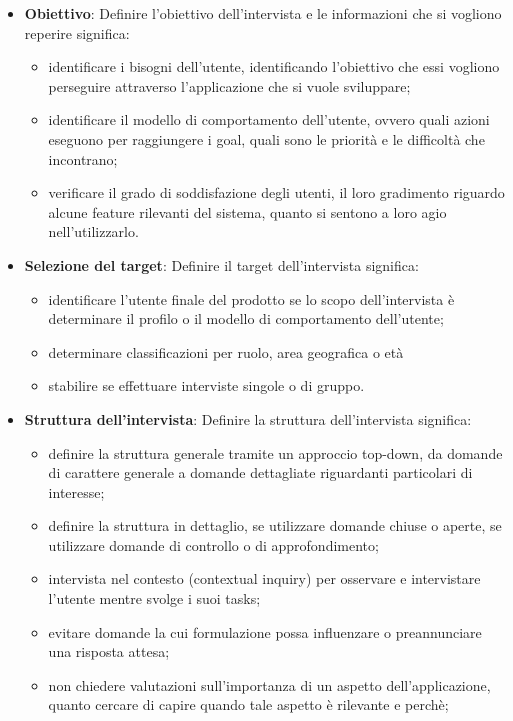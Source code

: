 \documentclass{report}
\begin{document}
	\begin{itemize}
		\item \textbf{Obiettivo}: Definire l'obiettivo dell'intervista e le informazioni che si vogliono reperire significa:
		\begin{itemize}
			\item identificare i bisogni dell'utente, identificando l'obiettivo che essi vogliono perseguire attraverso l'applicazione che si vuole sviluppare;
			\item identificare il modello di comportamento dell'utente, ovvero quali azioni eseguono per raggiungere i goal, quali sono le priorità e le difficoltà che incontrano;
			\item verificare il grado di soddisfazione degli utenti, il loro gradimento riguardo alcune feature rilevanti del sistema, quanto si sentono a loro agio nell'utilizzarlo.
		\end{itemize}
		\item \textbf{Selezione del target}: Definire il target dell'intervista significa:
		\begin{itemize}
			\item identificare l'utente finale del prodotto se lo scopo dell'intervista è determinare il profilo o il modello di comportamento dell'utente;
			\item determinare classificazioni per ruolo, area geografica o età
			\item stabilire se effettuare interviste singole o di gruppo.
		\end{itemize}
		\item \textbf{Struttura dell'intervista}: Definire la struttura dell'intervista significa:
		\begin{itemize}
			\item definire la struttura generale tramite un approccio top-down, da domande di carattere generale a domande dettagliate riguardanti particolari di interesse;
			\item definire la struttura in dettaglio, se utilizzare domande chiuse o aperte, se utilizzare domande di controllo o di approfondimento;
			\item intervista nel contesto (contextual inquiry) per osservare e intervistare l'utente mentre svolge i suoi tasks;
			\item evitare domande la cui formulazione possa influenzare o preannunciare una risposta attesa;
			\item non chiedere valutazioni sull'importanza di un aspetto dell'applicazione, quanto cercare di capire quando tale aspetto è rilevante e perchè;

\end{itemize}
\end{itemize}
\end{document}
